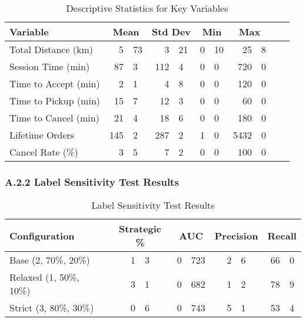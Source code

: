 \documentclass[12pt,letterpaper]{article}
\begin{document}
\begin{table}[H]
\centering
\caption{Descriptive Statistics for Key Variables}
\label{tab:descriptive_stats}
\begin{tabular}{l r@{.}l r@{.}l r@{.}l r@{.}l r@{.}l}
\toprule
\textbf{Variable} & \multicolumn{2}{c}{\textbf{Mean}} & \multicolumn{2}{c}{\textbf{Std Dev}} & \multicolumn{2}{c}{\textbf{Min}} & \multicolumn{2}{c}{\textbf{Max}} \\
\midrule
Total Distance (km)       & 5&73  & 3&21  & 0&10  & 25&8  \\
Session Time (min)        & 87&3  & 112&4 & 0&0   & 720&0 \\
Time to Accept (min)      & 2&1   & 4&8   & 0&0   & 120&0 \\
Time to Pickup (min)      & 15&7  & 12&3  & 0&0   & 60&0 \\
Time to Cancel (min)      & 21&4  & 18&6  & 0&0   & 180&0 \\
Lifetime Orders           & 145&2 & 287&2 & 1&0   & 5432&0 \\
Cancel Rate (\%)          & 3&5   & 7&2   & 0&0   & 100&0 \\
\bottomrule
\end{tabular}
\end{table}

\subsubsection*{A.2.2 Label Sensitivity Test Results}

\begin{table}[H]
\centering
\caption{Label Sensitivity Test Results}
\label{tab:label_sensitivity}
\begin{tabular}{p{4.5cm} r@{.}l r@{.}l r@{.}l r@{.}l}
\toprule
\textbf{Configuration} & \multicolumn{2}{c}{\textbf{Strategic \%}} & \multicolumn{2}{c}{\textbf{AUC}} & \multicolumn{2}{c}{\textbf{Precision}} & \multicolumn{2}{c}{\textbf{Recall}} \\
\midrule
Base (2, 70\%, 20\%)     & 1&3  & 0&723 & 2&6 & 66&0 \\
Relaxed (1, 50\%, 10\%)  & 3&1  & 0&682 & 1&2 & 78&9 \\
Strict (3, 80\%, 30\%)   & 0&6  & 0&743 & 5&1 & 53&4 \\
\bottomrule
\end{tabular}
\end{table}

\vspace{1em}
\end{document}
